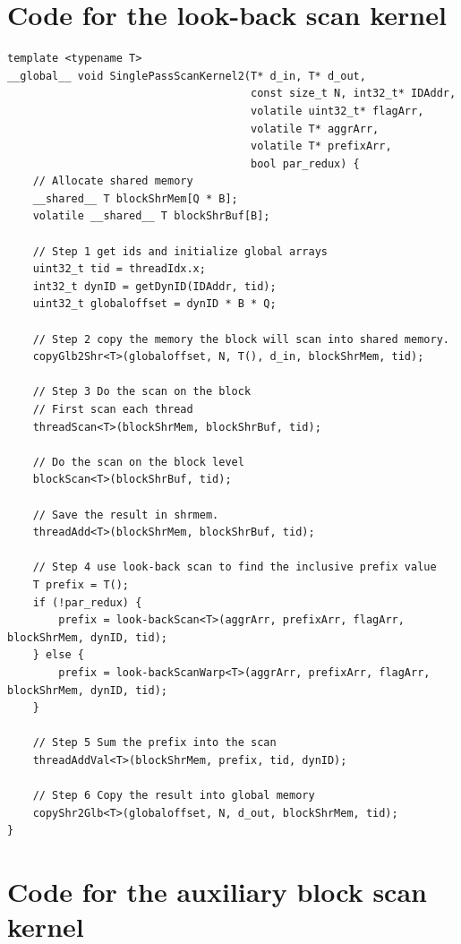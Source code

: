 \documentclass[twocolumn]{article}
\begin{document}
\newpage

\section{Code for the look-back scan kernel}

\begin{lstlisting}[caption=look-back kernel,label=lst:look-backKernel]
template <typename T>
__global__ void SinglePassScanKernel2(T* d_in, T* d_out,
                                      const size_t N, int32_t* IDAddr,
                                      volatile uint32_t* flagArr,
                                      volatile T* aggrArr,
                                      volatile T* prefixArr,
                                      bool par_redux) {
    // Allocate shared memory
    __shared__ T blockShrMem[Q * B];
    volatile __shared__ T blockShrBuf[B];

    // Step 1 get ids and initialize global arrays
    uint32_t tid = threadIdx.x;
    int32_t dynID = getDynID(IDAddr, tid);
    uint32_t globaloffset = dynID * B * Q;

    // Step 2 copy the memory the block will scan into shared memory.
    copyGlb2Shr<T>(globaloffset, N, T(), d_in, blockShrMem, tid);

    // Step 3 Do the scan on the block
    // First scan each thread
    threadScan<T>(blockShrMem, blockShrBuf, tid);

    // Do the scan on the block level
    blockScan<T>(blockShrBuf, tid);

    // Save the result in shrmem.
    threadAdd<T>(blockShrMem, blockShrBuf, tid);

    // Step 4 use look-back scan to find the inclusive prefix value
	T prefix = T();
	if (!par_redux) {
		prefix = look-backScan<T>(aggrArr, prefixArr, flagArr, blockShrMem, dynID, tid);
	} else {
		prefix = look-backScanWarp<T>(aggrArr, prefixArr, flagArr, blockShrMem, dynID, tid);
	}

    // Step 5 Sum the prefix into the scan
    threadAddVal<T>(blockShrMem, prefix, tid, dynID);

    // Step 6 Copy the result into global memory
    copyShr2Glb<T>(globaloffset, N, d_out, blockShrMem, tid);
}
\end{lstlisting}

\newpage

\section{Code for the auxiliary block scan kernel}
\end{document}
